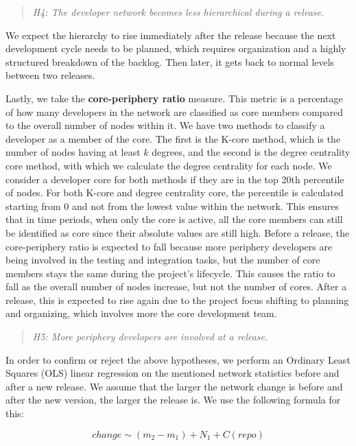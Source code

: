 \begin{quote}
    \textit{H4: The developer network becomes less hierarchical during a release.}
\end{quote}

We expect the hierarchy to rise immediately after the release because the next development cycle needs to be planned, which requires organization and a highly structured breakdown of the backlog. Then later, it gets back to normal levels between two releases.

Lastly, we take the \textbf{core-periphery ratio} measure. This metric is a percentage of how many developers in the network are classified as core members compared to the overall number of nodes within it. We have two methods to classify a developer as a member of the core. The first is the K-core method, which is the number of nodes having at least $k$ degrees, and the second is the degree centrality core method, with which we calculate the degree centrality for each node. We consider a developer core for both methods if they are in the top 20th percentile of nodes. For both K-core and degree centrality core, the percentile is calculated starting from 0 and not from the lowest value within the network. This ensures that in time periods, when only the core is active, all the core members can still be identified as core since their absolute values are still high. Before a release, the core-periphery ratio is expected to fall because more periphery developers are being involved in the testing and integration tasks, but the number of core members stays the same during the project's lifecycle. This causes the ratio to fall as the overall number of nodes increase, but not the number of cores. After a release, this is expected to rise again due to the project focus shifting to planning and organizing, which involves more the core development team.

\begin{quote}
    \textit{H5: More periphery developers are involved at a release.}
\end{quote}

In order to confirm or reject the above hypotheses, we perform an Ordinary Least Squares (OLS) linear regression on the mentioned network statistics before and after a new release. We assume that the larger the network change is before and after the new version, the larger the release is. We use the following formula for this:

 \[ change \sim (m_2 - m_1) + N_1 + C(repo) \]

